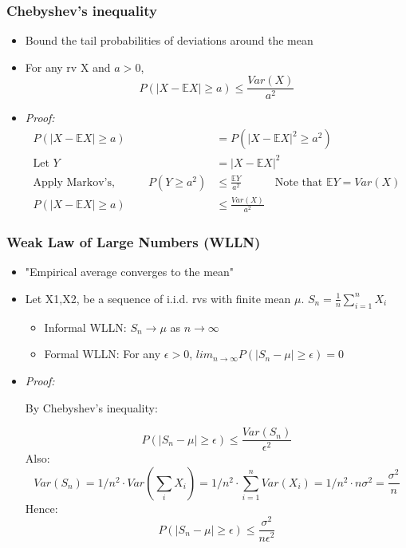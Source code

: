 \documentclass[24pt]{article}
\begin{document}
\subsubsection{Chebyshev's inequality}
\begin{itemize}
\item Bound the tail probabilities of deviations around the mean
\item For any rv X and $a>0$,
$$ P(|X-\mathbb{E}X| \ge a) \le \frac{Var(X)}{a^2}$$
\item \textit{Proof:}
\begin{align*}
P(|X-\mathbb{E}X| \ge a) &= P(|X-\mathbb{E}X|^2 \ge a^2)\\
\textrm{Let } Y &= |X-\mathbb{E}X|^2 \\
\textrm{Apply Markov's,} \qquad \quad P(Y \ge a^2) &\le \frac{\mathbb{E}Y}{a^2} \qquad \quad \textrm{Note that }  \mathbb{E}Y = Var(X) \\
P(|X-\mathbb{E}X| \ge a) &\le \frac{Var(X)}{a^2}
\end{align*}
\end{itemize}

\subsubsection{Weak Law of Large Numbers (WLLN)}
\begin{itemize}
\item "Empirical average converges to the mean"
\item Let X1,X2, be a sequence of i.i.d. rvs with finite mean $\mu$. $S_n = \frac{1}{n}\sum_{i=1}^nX_i$
\begin{itemize}
\item Informal WLLN: $S_n\rightarrow\mu$ as $n\rightarrow\infty$
\item Formal WLLN: For any $\epsilon > 0$, $lim_{n\rightarrow\infty}P(|S_n-\mu| \ge \epsilon) = 0$
\end{itemize}
\item \textit{Proof:} 

By Chebyshev's inequality:

$$P(|S_n-\mu| \ge \epsilon) \le \frac{Var(S_n)}{\epsilon^2} $$
Also:
$$ Var(S_n) = 1/n^2\cdot Var(\sum_i X_i) = 1/n^2 \cdot \sum_{i=1}^nVar(X_i)=1/n^2\cdot n\sigma^2 = \frac{\sigma^2}{n}$$
Hence:
$$P(|S_n-\mu| \ge \epsilon) \le \frac{\sigma^2}{n\epsilon^2}$$
\end{itemize}
\end{document}
